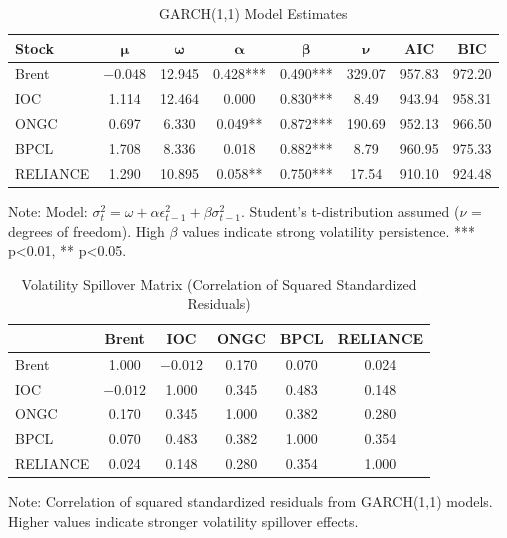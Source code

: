 \documentclass[11pt]{article}
\begin{document}
\begin{table}[htbp]
\centering
\caption{GARCH(1,1) Model Estimates}
\label{tab:garch}
\begin{tabular}{lccccccc}
\toprule
\textbf{Stock} & $\boldsymbol{\mu}$ & $\boldsymbol{\omega}$ & $\boldsymbol{\alpha}$ & $\boldsymbol{\beta}$ & $\boldsymbol{\nu}$ & \textbf{AIC} & \textbf{BIC} \\
\midrule
Brent     & $-0.048$ & 12.945 & 0.428*** & 0.490*** & 329.07 & 957.83 & 972.20 \\
IOC       & 1.114    & 12.464 & 0.000    & 0.830*** & 8.49   & 943.94 & 958.31 \\
ONGC      & 0.697    & 6.330  & 0.049**  & 0.872*** & 190.69 & 952.13 & 966.50 \\
BPCL      & 1.708    & 8.336  & 0.018    & 0.882*** & 8.79   & 960.95 & 975.33 \\
RELIANCE  & 1.290    & 10.895 & 0.058**  & 0.750*** & 17.54  & 910.10 & 924.48 \\
\bottomrule
\end{tabular}
\begin{tablenotes}
\small
\item Note: Model: $\sigma_t^2 = \omega + \alpha \epsilon_{t-1}^2 + \beta \sigma_{t-1}^2$. Student's t-distribution assumed ($\nu$ = degrees of freedom). High $\beta$ values indicate strong volatility persistence. *** p<0.01, ** p<0.05.
\end{tablenotes}
\end{table}

\begin{table}[htbp]
\centering
\caption{Volatility Spillover Matrix (Correlation of Squared Standardized Residuals)}
\label{tab:vol_spillover}
\begin{tabular}{lccccc}
\toprule
 & \textbf{Brent} & \textbf{IOC} & \textbf{ONGC} & \textbf{BPCL} & \textbf{RELIANCE} \\
\midrule
Brent     & 1.000 & $-0.012$ & 0.170 & 0.070 & 0.024 \\
IOC       & $-0.012$ & 1.000 & 0.345 & 0.483 & 0.148 \\
ONGC      & 0.170 & 0.345 & 1.000 & 0.382 & 0.280 \\
BPCL      & 0.070 & 0.483 & 0.382 & 1.000 & 0.354 \\
RELIANCE  & 0.024 & 0.148 & 0.280 & 0.354 & 1.000 \\
\bottomrule
\end{tabular}
\begin{tablenotes}
\small
\item Note: Correlation of squared standardized residuals from GARCH(1,1) models. Higher values indicate stronger volatility spillover effects.
\end{tablenotes}
\end{table}
\end{document}
